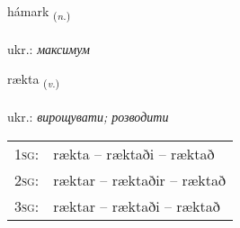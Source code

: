 \documentclass[frontgrid, backgrid]{flacards}\usepackage[]{graphicx}\usepackage[]{xcolor}
\begin{document}
\renewcommand{\flhead}{\vskip5pt \fboxsep=0pt {\small\bfseries\footnotesize Nafnorð | іменник}}
\renewcommand{\fcfoot}{\vskip5pt \fboxsep=0pt \hspace{2pt}{\small\bfseries\footnotesize 3K}}

\renewcommand{\blhead}{\vskip5pt {\small\bfseries\footnotesize Nafnorð | іменник }}
\renewcommand{\bcfoot}{\vskip5pt \hspace{2pt}{\small\bfseries\footnotesize 3K}}


{hámark \small{\textsubscript{(\textit{n.})}} \\[1ex] %
\textphonetic{[hauːmar̥k]} \\
ukr.: \emph{максимум} \\  [2ex]
\renewcommand*{\arraystretch}{0.8}
}

\renewcommand{\flhead}{\vskip5pt \fboxsep=0pt {\small\bfseries\footnotesize Sagnorð | дієслово}}
\renewcommand{\fcfoot}{\vskip5pt \fboxsep=0pt \hspace{2pt}{\small\bfseries\footnotesize 3K}}

\renewcommand{\blhead}{\vskip5pt {\small\bfseries\footnotesize Sagnorð | дієслово }}
\renewcommand{\bcfoot}{\vskip5pt \hspace{2pt}{\small\bfseries\footnotesize 3K}}


{rækta \small{\textsubscript{(\textit{v.})}} \\[1ex] %
\textphonetic{[raixta]} \\
ukr.: \emph{вирощувати; розводити} \\  [2ex]
\renewcommand*{\arraystretch}{0.8}
\begin{tabular}{p{1cm}l}
\textsc{1sg}: & rækta -- ræktaði -- ræktað \\ 
\textsc{2sg}: & ræktar -- ræktaðir -- ræktað \\ 
\textsc{3sg}: & ræktar -- ræktaði -- ræktað \\ 
\end{tabular}
}
\end{document}
